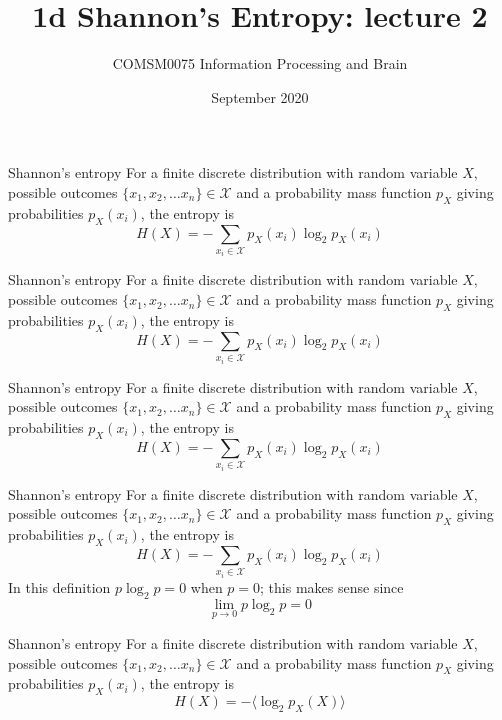 \documentclass{beamer}
\title[1d Shannon's Entropy: lecture 2]{1d Shannon's Entropy: lecture 2}
\author{COMSM0075 Information Processing and Brain}
\institute{\texttt{comsm0075.github.io}}
\date{September 2020}
\newcommand{\crish}{\color{reddish}}
\newcommand{\cbla}{\color{black}}
\newcommand{\cblu}{\color{blue}}
\newcommand{\sm}{\color{reddish}$}
\newcommand{\fm}{$\color{black}{}}
\begin{document}
\maketitle

\begin{frame}{Shannon's entropy}
  For a finite discrete distribution with random variable \sm X\fm,
  possible outcomes \sm\{x_1,x_2,\ldots x_n\}\in\mathcal{X}\fm{} and a
  probability mass function \sm p_X\fm{} giving probabilities \sm p_X(x_i)\fm, the
  entropy is
\crish
  $$
H(X)=-\sum_{x_i\in \mathcal{X}}{p_X(x_i)\log_2p_X(x_i)}
  $$
\cbla
\end{frame}



\begin{frame}{Shannon's entropy}
  For a finite discrete distribution with random variable \sm X\fm,
  possible outcomes \cblu $\{x_1,x_2,\ldots x_n\}\in\mathcal{X}$\cbla{} and a
  probability mass function \sm p_X\fm{} giving probabilities \sm p_X(x_i)\fm, the
  entropy is
\crish
  $$
H(X)=-\sum_{x_i\in \mathcal{X}}{p_X(x_i)\log_2p_X(x_i)}
  $$
\cbla
\end{frame}


\begin{frame}{Shannon's entropy}
  For a finite discrete distribution with random variable \sm X\fm,
  possible outcomes \sm\{x_1,x_2,\ldots x_n\}\in\mathcal{X}\fm{} and a
  probability mass function \sm p_X\fm{} giving probabilities \cblu$ p_X(x_i)$\cbla, the
  entropy is
\crish
  $$
H(X)=-\sum_{x_i\in \mathcal{X}}{p_X(x_i)\log_2p_X(x_i)}
  $$
\cbla
\end{frame}


\begin{frame}{Shannon's entropy}
  For a finite discrete distribution with random variable \sm X\fm,
  possible outcomes \sm\{x_1,x_2,\ldots x_n\}\in\mathcal{X}\fm{} and a
  probability mass function \sm p_X\fm{} giving probabilities \sm p_X(x_i)\fm, the
  entropy is
\crish
  $$
H(X)=-\sum_{x_i\in \mathcal{X}}{p_X(x_i)\log_2p_X(x_i)}
  $$
\cbla
In this definition \sm p\log_2{p}=0\fm{} when \sm p=0\fm; this makes sense since
\crish
$$
\lim_{p\rightarrow 0}p\log_2{p}=0
$$
\cbla

\end{frame}



\begin{frame}{Shannon's entropy}
  For a finite discrete distribution with random variable \sm X\fm,
  possible outcomes \sm\{x_1,x_2,\ldots x_n\}\in\mathcal{X}\fm{} and a
  probability mass function \sm p_X\fm{} giving probabilities \sm p_X(x_i)\fm, the
  entropy is
\crish
  $$
H(X)=-\langle \log_2{p_X(X)}\rangle
  $$
\cbla
\end{frame}
\end{document}

